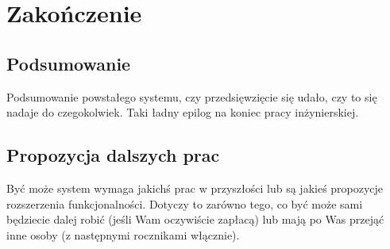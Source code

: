 \chapter{Zakończenie}
\label{Chapter9}

\section{Podsumowanie}
\label{Chapter91}

Podsumowanie powstałego systemu, czy przedsięwzięcie się udało, czy to się nadaje do czegokolwiek. Taki ładny epilog na koniec pracy inżynierskiej.

\section{Propozycja dalszych prac}
\label{Chapter92}

Być może system wymaga jakichś prac w przyszłości lub są jakieś propozycje rozszerzenia funkcjonalności. Dotyczy to zarówno tego, co być może sami będziecie dalej robić (jeśli Wam oczywiście zapłacą) lub mają po Was przejąć inne osoby (z następnymi rocznikami włącznie).